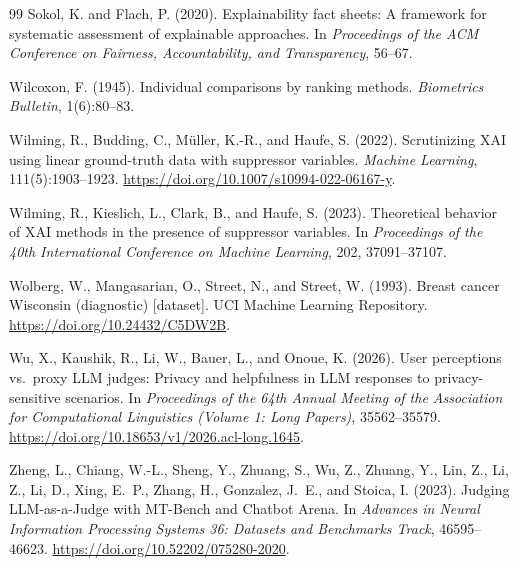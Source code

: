 \documentclass[10pt,a4paper,twoside]{article}
\begin{document}
\begin{thebibliography}{99}
Sokol, K. and Flach, P. (2020).
Explainability fact sheets: A framework for systematic assessment of
explainable approaches.
In \emph{Proceedings of the ACM Conference on Fairness, Accountability,
and Transparency}, 56--67.

Wilcoxon, F. (1945).
Individual comparisons by ranking methods.
\emph{Biometrics Bulletin}, 1(6):80--83.

Wilming, R., Budding, C., M\"{u}ller, K.-R., and Haufe, S. (2022).
Scrutinizing {XAI} using linear ground-truth data with suppressor variables.
\emph{Machine Learning}, 111(5):1903--1923.
\url{https://doi.org/10.1007/s10994-022-06167-y}.

Wilming, R., Kieslich, L., Clark, B., and Haufe, S. (2023).
Theoretical behavior of {XAI} methods in the presence of suppressor
variables.
In \emph{Proceedings of the 40th International Conference on Machine
Learning}, 202, 37091--37107.

Wolberg, W., Mangasarian, O., Street, N., and Street, W. (1993).
Breast cancer {Wisconsin} (diagnostic) [dataset].
UCI Machine Learning Repository.
\url{https://doi.org/10.24432/C5DW2B}.

Wu, X., Kaushik, R., Li, W., Bauer, L., and Onoue, K. (2026).
User perceptions vs.\ proxy LLM judges: Privacy and helpfulness in LLM
responses to privacy-sensitive scenarios.
In \emph{Proceedings of the 64th Annual Meeting of the Association for
Computational Linguistics (Volume 1: Long Papers)}, 35562--35579.
\url{https://doi.org/10.18653/v1/2026.acl-long.1645}.

Zheng, L., Chiang, W.-L., Sheng, Y., Zhuang, S., Wu, Z., Zhuang, Y.,
Lin, Z., Li, Z., Li, D., Xing, E.~P., Zhang, H., Gonzalez, J.~E., and
Stoica, I. (2023).
Judging LLM-as-a-Judge with MT-Bench and Chatbot Arena.
In \emph{Advances in Neural Information Processing Systems 36: Datasets
and Benchmarks Track}, 46595--46623.
\url{https://doi.org/10.52202/075280-2020}.


\end{thebibliography}
\end{document}
